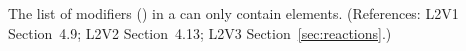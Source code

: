 The list of modifiers () in a \Reaction can only
contain  elements.  (References: L2V1
Section~4.9; L2V2 Section~4.13; L2V3 Section~\ref{sec:reactions}.)
